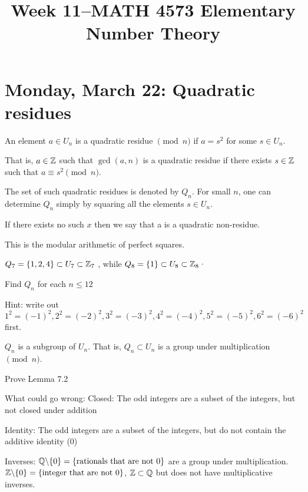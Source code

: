 \documentclass[letterpaper, 11 pt]{article}
\title{Week 11--MATH 4573 Elementary Number Theory}
\begin{document}
\maketitle
\tableofcontents
\section{Monday, March 22: Quadratic residues}
\begin{defn}
 An element $a\in U_n$ is a quadratic residue $\pmod n$ if $a= s^2 $ for some $s\in U_n$.

That is, $a\in \mathbb Z$ such that $\gcd(a,n)$ is a quadratic residue if there exists $s\in \mathbb Z$ such that $a\equiv s^2 \pmod n$.

The set of such quadratic residues is denoted by $Q_n$. For small $n$, one can determine $Q_n$ simply by squaring all the elements $s\in U_n.$

If there exists no such $x$ then we say that a is a quadratic non-residue.

\end{defn}

This is the modular arithmetic of perfect squares.

\begin{example}[Example 7.1]
 $Q_7 = \{1,2,4\} \subset U_7\subset \mathbb Z_7$ , while $Q_8= \{1\} \subset U_8\subset \mathbb Z_8$·
\end{example}
\begin{br}
 Find $Q_n$ for each $n\leq 12$
 
 Hint: write out $1^2=(-1)^2, 2^2=(-2)^2, 3^2=(-3)^2, 4^2=(-4)^2, 5^2=(-5)^2, 6^2=(-6)^2$ first.
\end{br}


\begin{lem}[Lemma 7.2]
$Q_n$ is a subgroup of $U_n$. That is, $Q_n\subset U_n$ is a group under multiplication $\pmod n$.
\end{lem}

\begin{br}[5 min]
 Prove Lemma 7.2
\end{br}

What could go wrong: 
Closed: The odd integers are a subset of the integers, but not closed under addition

Identity: The odd integers are a subset of the integers, but do not contain the additive identity (0)

Inverses: $\mathbb Q\backslash\{0\}=\{\textrm{rationals that are not 0}\}$ are a group under multiplication. $\mathbb Z\backslash\{0\}=\{\textrm{integer that are not 0}\}$, $\mathbb Z\subset\mathbb Q$ but does not have multiplicative inverses.
\end{document}
